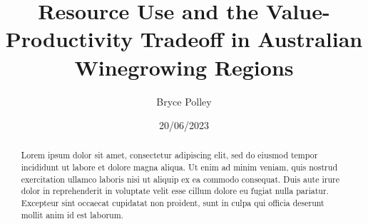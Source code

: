 \documentclass[review,12pt,authoryear]{elsarticle}
\begin{document}
\begin{linenumbers}
\begin{frontmatter}




    \title{Resource Use and the Value-Productivity Tradeoff in Australian Winegrowing Regions}



\author[label1,label2,label3]{Bryce Polley}
\date{20/06/2023}

      


    \begin{abstract}
      Lorem ipsum dolor sit amet, consectetur adipiscing elit, sed do eiusmod tempor incididunt ut labore et dolore magna aliqua. Ut enim ad minim veniam, quis nostrud exercitation ullamco laboris nisi ut aliquip ex ea commodo consequat. Duis aute irure dolor in reprehenderit in voluptate velit esse cillum dolore eu fugiat nulla pariatur. Excepteur sint occaecat cupidatat non proident, sunt in culpa qui officia deserunt mollit anim id est laborum.
      \end{abstract}


\end{frontmatter}
\end{linenumbers}
\end{document}
